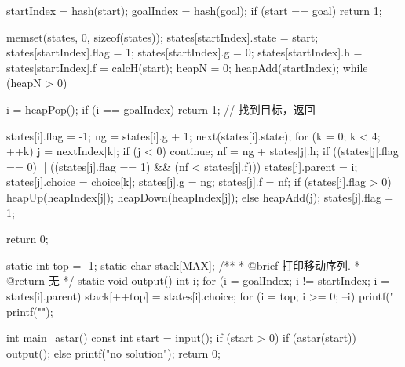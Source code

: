 \begin{Codex}[label=eight_digits_astar.c]
{    startIndex = hash(start);
    goalIndex  = hash(goal);
    if (start == goal) return 1;
    
    memset(states, 0, sizeof(states));
    states[startIndex].state = start;
    states[startIndex].flag    = 1;
    states[startIndex].g       = 0;
    states[startIndex].h       = states[startIndex].f = calcH(start);
    heapN = 0;
    heapAdd(startIndex);
    while (heapN > 0) {
        i = heapPop();
        if (i == goalIndex) return 1; // 找到目标，返回

        states[i].flag = -1;
        ng = states[i].g + 1;
        next(states[i].state);
        for (k = 0; k < 4; ++k) {
            j = nextIndex[k];
            if (j < 0) continue;
            nf = ng + states[j].h;
            if ((states[j].flag == 0) || ((states[j].flag == 1) &&
                (nf < states[j].f))) {
                states[j].parent = i;
                states[j].choice = choice[k];
                states[j].g    = ng;
                states[j].f    = nf;
                if (states[j].flag > 0) {
                    heapUp(heapIndex[j]);
                    heapDown(heapIndex[j]);
                } else {
                    heapAdd(j);
                    states[j].flag = 1;
                }
            }
        }
    }
    return 0;
}

static int top = -1;
static char stack[MAX];
/**
 * @brief 打印移动序列.
 * @return 无
 */
static void output() {
    int i;
    for (i = goalIndex; i != startIndex; i = states[i].parent) {
        stack[++top] = states[i].choice;
    }
    for (i = top; i >= 0; --i) {
        printf("%
    }
    printf("\n");
}

int main_astar() {
    const int start = input();
    if (start > 0) {
        if (astar(start)) {
            output();
        } else {
            printf("no solution\n");
        }
    }
    return 0;
}
\end{Codex}
